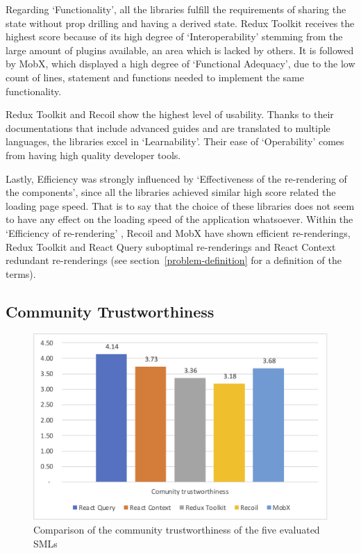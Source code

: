 Regarding `Functionality', all the libraries fulfill the requirements of
sharing the state without prop drilling and having a derived state.
Redux Toolkit receives the highest score because of its high degree of
`Interoperability' stemming from the large amount of plugins available,
an area which is lacked by others. It is followed by MobX, which
displayed a high degree of `Functional Adequacy', due to the low count
of lines, statement and functions needed to implement the same
functionality.

Redux Toolkit and Recoil show the highest level of usability. Thanks to
their documentations that include advanced guides and are translated to
multiple languages, the libraries excel in `Learnability'. Their ease of
`Operability' comes from having high quality developer tools.

Lastly, Efficiency was strongly influenced by `Effectiveness of the
re-rendering of the components', since all the libraries achieved
similar high score related the loading page speed. That is to say that the
choice of these libraries does not seem to have any effect on the loading speed
of the application whatsoever. Within the `Efficiency of re-rendering'
, Recoil and MobX have shown efficient
re-renderings, Redux Toolkit and React Query suboptimal re-renderings and
React Context redundant re-renderings (see section~\ref{problem-definition} for a definition of the terms).

\hypertarget{community-trustworthiness}{%
    \subsection{Community
    Trustworthiness}\label{community-trustworthiness}}

\begin{figure}
    \centering
    \includegraphics{images/chart_comminity_trustworthiness}
    \caption{Comparison of the community trustworthiness of the five evaluated SMLs}
    \label{image_results_community_trustworthiness}
\end{figure}

